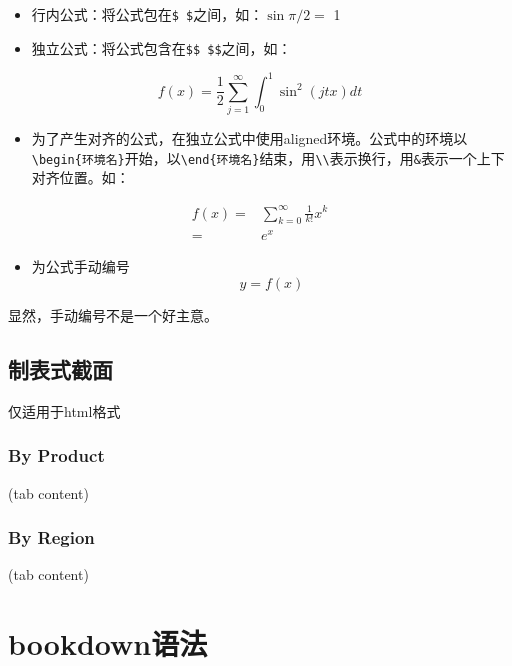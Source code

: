 \documentclass[]{article}
\providecommand{\tightlist}{%
  \setlength{\itemsep}{0pt}\setlength{\parskip}{0pt}}
\begin{document}
\begin{itemize}
\tightlist
\item
  行内公式：将公式包在\texttt{\$\ \$}之间，如：\(\sin\pi/2=\) 1\\
\item
  独立公式：将公式包含在\texttt{\$\$\ \$\$}之间，如：
\end{itemize}

\[
  f(x)=\frac{1}{2} \sum_{j=1}^{\infty} \int_{0}^{1} \sin ^{2}(j t x) d t
\]

\begin{itemize}
\tightlist
\item
  为了产生对齐的公式，在独立公式中使用aligned环境。公式中的环境以\texttt{\textbackslash{}begin\{环境名\}}开始，以\texttt{\textbackslash{}end\{环境名\}}结束，用\texttt{\textbackslash{}\textbackslash{}}表示换行，用\texttt{\&}表示一个上下对齐位置。如：
\end{itemize}

\[
\begin{aligned}
  f(x) =& \sum_{k=0}^\infty \frac{1}{k!} x^k \\
  =& e^x
\end{aligned}
\]

\begin{itemize}
\tightlist
\item
  为公式手动编号
  \[
  y = f(x) \tag{label}
  \]
\end{itemize}

显然，手动编号不是一个好主意。

\hypertarget{section-24}{%
\subsection{制表式截面}\label{section-24}}

仅适用于html格式

\hypertarget{by-product}{%
\subsubsection{By Product}\label{by-product}}

(tab content)

\hypertarget{by-region}{%
\subsubsection{By Region}\label{by-region}}

(tab content)

\hypertarget{bookdown}{%
\section{bookdown语法}\label{bookdown}}
\end{document}
